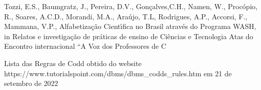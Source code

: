 \documentclass[
12pt,		%
openright,	%
twoside,  %
a4paper,			%
chapter=TITLE,		%
english,			%
french,				%
spanish,			%
brazil				%
]{USPSC-classe/USPSC}
\begin{document}
\begin{flushleft}
\begin{flushleft}
\begin{flushleft}
\begin{flushleft}
\begin{flushleft}
\begin{flushleft}
\begin{flushleft}
\begin{flushleft}
\begin{flushleft}
[TOZZI, 2021a] Tozzi, E.S., Baumgratz, J., Pereira, D.V., Gon\c{c}alves,C.H., Namen, W., Proc\'opio, R., Soares, A.C.D., Morandi, M.A., Ara\'ujo, T.L, Rodrigues, A.P., Accorsi, F., Mammana, V.P., Alfabetiza\c{c}\~ao Cient\'{\i}fica no Brasil atrav\'es do Programa WASH, in Relatos e investiga\c{c}\~ao de pr\'aticas de ensino de Ci\^encias e Tecnologia Atas do Encontro internacional “A Voz dos Professores de C
\end{flushleft}


\end{flushleft}


\end{flushleft}


\end{flushleft}


\end{flushleft}


\end{flushleft}


\end{flushleft}


\end{flushleft}


\end{flushleft}


\begin{flushleft}
\begin{flushleft}
\begin{flushleft}
\begin{flushleft}
\begin{flushleft}
\begin{flushleft}
\begin{flushleft}
\begin{flushleft}
\begin{flushleft}
[TutorialsPoint, 2022] Lista das Regras de Codd obtido do website https://www.tutorialspoint.com/dbms/dbms\_codds\_rules.htm em 21 de setembro de 2022
\end{flushleft}


\end{flushleft}


\end{flushleft}


\end{flushleft}


\end{flushleft}


\end{flushleft}


\end{flushleft}


\end{flushleft}


\end{flushleft}
\end{document}
